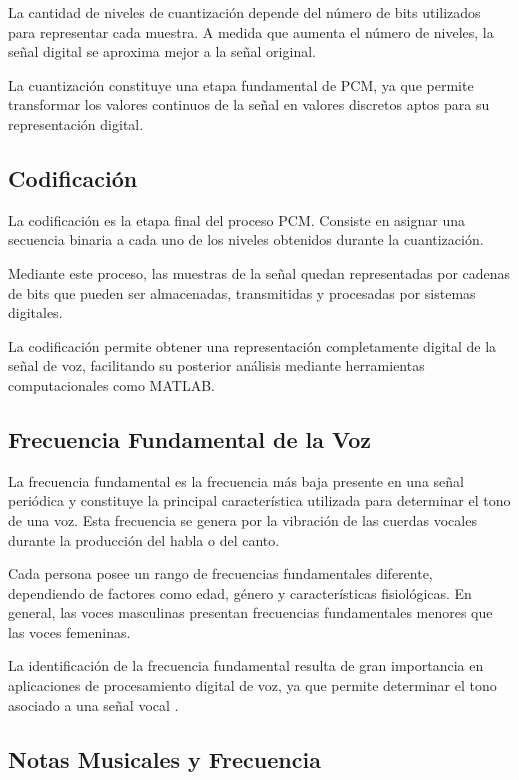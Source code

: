 \documentclass[12pt]{article}
\begin{document}
La cantidad de niveles de cuantización depende del número de bits utilizados para representar cada muestra. A medida que aumenta el número de niveles, la señal digital se aproxima mejor a la señal original.

La cuantización constituye una etapa fundamental de PCM, ya que permite transformar los valores continuos de la señal en valores discretos aptos para su representación digital.



\subsection{Codificación}

La codificación es la etapa final del proceso PCM. Consiste en asignar una secuencia binaria a cada uno de los niveles obtenidos durante la cuantización.

Mediante este proceso, las muestras de la señal quedan representadas por cadenas de bits que pueden ser almacenadas, transmitidas y procesadas por sistemas digitales.

La codificación permite obtener una representación completamente digital de la señal de voz, facilitando su posterior análisis mediante herramientas computacionales como MATLAB.



\subsection{Frecuencia Fundamental de la Voz}

La frecuencia fundamental es la frecuencia más baja presente en una señal periódica y constituye la principal característica utilizada para determinar el tono de una voz. Esta frecuencia se genera por la vibración de las cuerdas vocales durante la producción del habla o del canto.

Cada persona posee un rango de frecuencias fundamentales diferente, dependiendo de factores como edad, género y características fisiológicas. En general, las voces masculinas presentan frecuencias fundamentales menores que las voces femeninas.

La identificación de la frecuencia fundamental resulta de gran importancia en aplicaciones de procesamiento digital de voz, ya que permite determinar el tono asociado a una señal vocal \cite{pitch}.


\subsection{Notas Musicales y Frecuencia}
\end{document}
